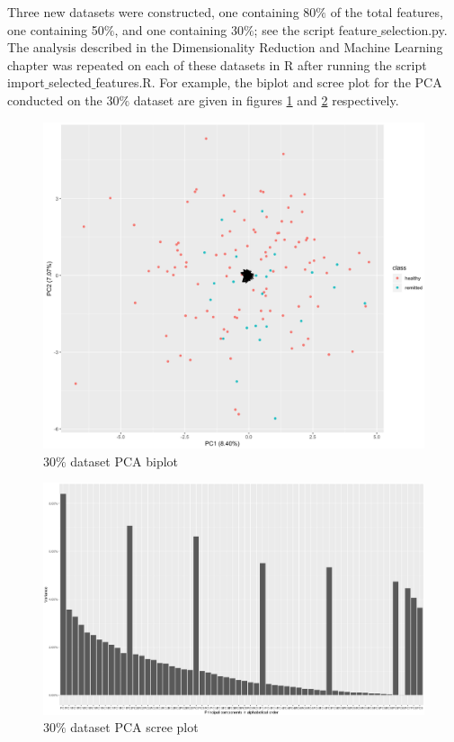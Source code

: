 \documentclass[12pt]{report}
\begin{document}
		Three new datasets were constructed, one containing 80$\%$ of the total features, one containing 50$\%$, and one containing 30$\%$; see the script feature$\_$selection.py. The analysis described in the Dimensionality Reduction and Machine Learning chapter was repeated on each of these datasets in R after running the script import$\_$selected$\_$features.R. For example, the biplot and scree plot for the PCA conducted on the 30$\%$ dataset are given in figures \ref{rfe60biplot} and \ref{rfe60screeplot} respectively.
		
		\begin{figure}[H]
			\centering
			\includegraphics[scale=0.2]{Images/rfe60_biplot.png}
			\caption{30$\%$ dataset PCA biplot}
			\label{rfe60biplot}
		\end{figure}
	
		\begin{figure}[H]
			\centering
			\includegraphics[scale=0.2]{Images/rfe60_screeplot.png}
			\caption{30$\%$ dataset PCA scree plot}
			\label{rfe60screeplot}
		\end{figure}
		
\end{document}
